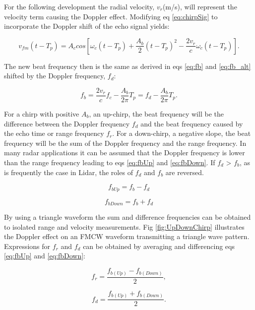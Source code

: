  For the following development the radial velocity, $v_r$(m/s), will represent the velocity 
 term causing the Doppler effect. Modifying eq \ref{eq:chirpSig} to incorporate the Doppler 
 shift of the echo signal yields:
 
 \begin{equation}
	 \label{eq:chirpSigDop}
	 v_{fm}(t-T_p)=A_c cos[\omega_c(t-T_p)+\frac{A_b}{2} (t-T_p)^2-\frac{2v_r}{c}\omega_c(t-T_p)].
 \end{equation}
  
The new beat frequency then is the same as derived in eqs \ref{eq:fb} and \ref{eq:fb_alt} shifted
by the Doppler frequency, $f_d$:

\begin{equation}
	\label{eq:fbDop}
	f_b=\frac{2v_r}{c}f_c-\frac{A_b}{2\pi}T_p
	  =f_d-\frac{A_b}{2\pi}T_p.
\end{equation}

For a chirp with positive $A_b$, an up-chirp, the beat frequency will be the difference between 
the Doppler frequency $f_d$ and the beat frequency caused by the echo time or range frequency $f_r$. For a down-chirp, a negative
slope, the beat frequency will be the sum of the Doppler frequency and the range frequency. In many radar applications
it can be assumed that the Doppler frequency is lower than the range frequency leading to eqs \ref{eq:fbUp} and \ref{eq:fbDown}.
If $f_d$ > $f_b$, as is frequently the case in Lidar, the roles of $f_d$ and $f_b$ are reversed. 

\begin{equation}
\label{eq:fbUp}
f_{bUp}=f_b - f_d
\end{equation}

\begin{equation}
\label{eq:fbDown}
f_{bDown}=f_b + f_d
\end{equation}

By using a triangle waveform the sum and difference frequencies can be obtained to isolated range and velocity measurements. 
Fig \ref{fig:UpDownChirp} illustrates the Doppler effect on an FMCW waveform transmitting a triangle wave pattern.  
Expressions for $f_r$ and $f_d$ can be obtained by averaging and differencing eqs  \ref{eq:fbUp} and \ref{eq:fbDown}:

 \begin{equation}
 \label{eq:fr}
 f_r = \frac{f_{b(Up)}-f_{b(Down)}}{2},
 \end{equation}

 \begin{equation}
\label{eq:fd}
f_d = \frac{f_{b(Up)}+f_{b(Down)}}{2}.
\end{equation}

